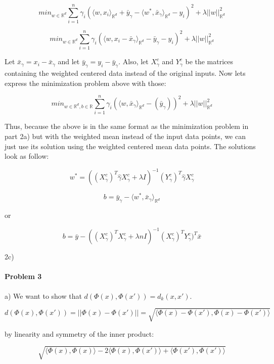 \documentclass[12pt]{report}
\begin{document}
$$min_{w \in \mathbb{R}^d } \sum_{i=1}^{n}\gamma_i ( \langle w, x_i\rangle_{\mathbb{R}^d} + \bar{y}_\gamma -\langle w^*, \bar{x}_{\gamma} \rangle_{\mathbb{R}^d} - y_i)^2 + \lambda ||w||_{\mathbb{R}^d}^2$$

$$min_{w \in \mathbb{R}^d } \sum_{i=1}^{n}\gamma_i ( \langle w, x_i - \bar{x}_{\gamma}\rangle_{\mathbb{R}^d}  - \bar{y}_\gamma - y_i )^2 + \lambda ||w||_{\mathbb{R}^d}^2$$

Let $\bar{x}_{\gamma} = x_i - \bar{x}_{\gamma}$ and let $\bar{y}_{\gamma} = y_i - \bar{y}_{\gamma}$. Also, let $X^{c}_{\gamma}$ and $Y^{c}_{\gamma}$ be the matrices containing the weighted centered data instead of the original inputs. Now lets express the minimization problem above with those:

$$min_{w \in \mathbb{R}^d, b \in \mathbb{R}} \sum_{i=1}^{n} \gamma_i ( \langle w, \bar{x}_{\gamma}\rangle_{\mathbb{R}^d}  - (\bar{y}_{\gamma}) )^2 + \lambda ||w||_{\mathbb{R}^d}^2$$

Thus, because the above is in the same format as the minimization problem in part 2a) but with the weighted mean instead of the input data points, we can just use its solution using the weighted centered mean data points. The solutions look as follow:

$$ w^* = ((X^c_{\gamma})^T \hat{\gamma} X^c_{\gamma} + \lambda I)^{-1}(Y^c_{\gamma})^T  \hat{\gamma}  X^c_{\gamma} $$

$$b= \bar{y}_\gamma -\langle w^*, \bar{x}_{\gamma} \rangle_{\mathbb{R}^d}$$

or 

$$b= \bar{y} -((X^c_{\gamma})^TX^c_{\gamma} + \lambda n I)^{-1}(X^c_{\gamma})^TY^c_{\gamma})^T \bar{x}$$

2c)



\paragraph{Problem 3}

a) We want to show that $d(\Phi(x), \Phi(x')) = d_{k}(x, x') $.

$$d(\Phi(x), \Phi(x')) = || \Phi(x) - \Phi(x')|| = \sqrt{ \langle \Phi(x) - \Phi(x'), \Phi(x) - \Phi(x') \rangle}$$

by linearity and symmetry of the inner product:

$$\sqrt{ \langle \Phi(x), \Phi(x) \rangle -  2\langle \Phi(x), \Phi(x') \rangle + \langle \Phi(x'), \Phi(x') \rangle}$$
\end{document}
